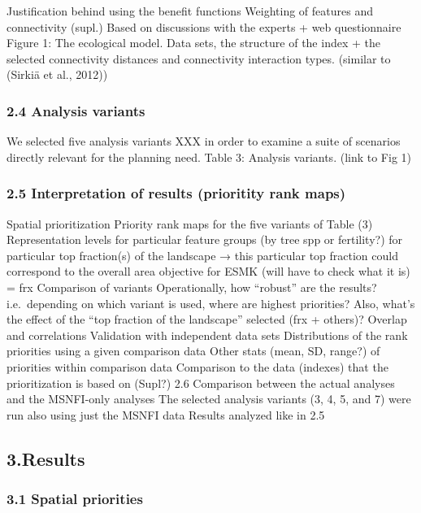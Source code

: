 \documentclass[]{article}
\begin{document}
Justification behind using the benefit functions Weighting of features
and connectivity (supl.) Based on discussions with the experts + web
questionnaire Figure 1: The ecological model. Data sets, the structure
of the index + the selected connectivity distances and connectivity
interaction types. (similar to (Sirkiä et al., 2012)⁠)

\subsubsection{2.4 Analysis variants}

We selected five analysis variants XXX in order to examine a suite of
scenarios directly relevant for the planning need. Table 3: Analysis
variants. (link to Fig 1)

\subsubsection{2.5 Interpretation of results (prioritity rank maps)}

Spatial prioritization Priority rank maps for the five variants of Table
(3) Representation levels for particular feature groups (by tree spp or
fertility?) for particular top fraction(s) of the landscape → this
particular top fraction could correspond to the overall area objective
for ESMK (will have to check what it is) = frx Comparison of variants
Operationally, how ``robust'' are the results? i.e.~depending on which
variant is used, where are highest priorities? Also, what's the effect
of the ``top fraction of the landscape'' selected (frx + others)?
Overlap and correlations Validation with independent data sets
Distributions of the rank priorities using a given comparison data Other
stats (mean, SD, range?) of priorities within comparison data Comparison
to the data (indexes) that the prioritization is based on (Supl?) 2.6
Comparison between the actual analyses and the MSNFI-only analyses The
selected analysis variants (3, 4, 5, and 7) were run also using just the
MSNFI data Results analyzed like in 2.5

\subsection{3.Results}

\subsubsection{3.1 Spatial priorities}
\end{document}
